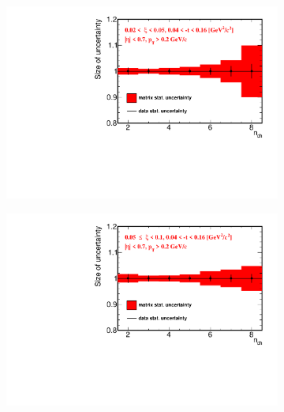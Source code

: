 \begin{figure}[t!]
	\centering
	\begin{subfigure}{.49\textwidth}
		\includegraphics[width=\textwidth,page=1]{chapters/chrgSTAR/img/unfolding/matrix_stat_0.pdf}
	\end{subfigure}
	\hfill
	\begin{subfigure}{.49\textwidth}
		\includegraphics[width=\textwidth,page=1]{chapters/chrgSTAR/img/unfolding/matrix_stat_1.pdf}
	\end{subfigure}
	\begin{subfigure}{.49\textwidth}

\end{subfigure}
\end{figure}
